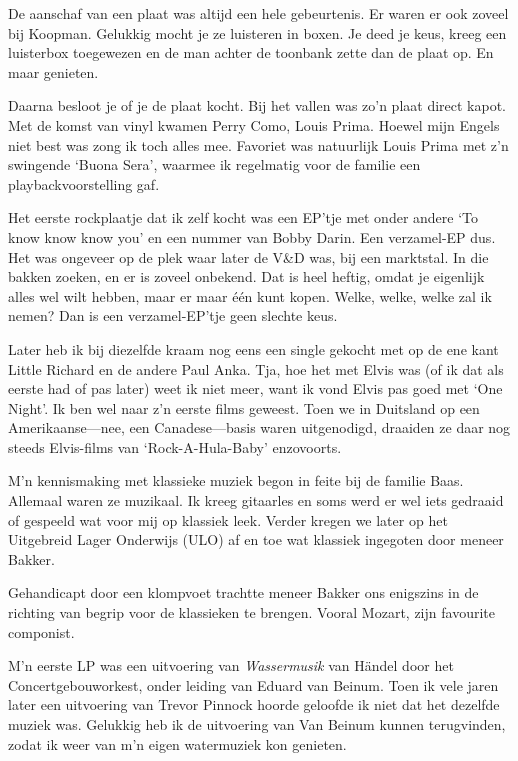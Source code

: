 \documentclass[12pt,twoside, openright]{memoir}
\begin{document}
De aanschaf van een plaat was altijd een hele gebeurtenis. Er waren er ook zoveel bij Koopman. Gelukkig mocht je ze luisteren in boxen. Je deed je keus, kreeg een luisterbox toegewezen en de man achter de toonbank zette dan de plaat op. En maar genieten. 

Daarna besloot je of je de plaat kocht. Bij het vallen was zo’n plaat direct kapot. Met de komst van vinyl kwamen Perry Como, Louis Prima. Hoewel mijn Engels niet best was zong ik toch alles mee. Favoriet was natuurlijk Louis Prima met z’n swingende `Buona Sera', waarmee ik regelmatig voor de familie een playbackvoorstelling gaf.


Het eerste rockplaatje dat ik zelf kocht was een EP'tje met onder andere `To know know know you' en een nummer van Bobby Darin. Een verzamel-EP dus. Het was ongeveer op de plek waar later de V\&D was, bij een marktstal. In die bakken zoeken, en er is zoveel onbekend. Dat is heel heftig, omdat je eigenlijk alles wel wilt hebben, maar er maar één kunt kopen. Welke, welke, welke zal ik nemen? Dan is een verzamel-EP'tje geen slechte keus.

Later heb ik bij diezelfde kraam nog eens een single gekocht met op de ene kant Little Richard en de andere Paul Anka. Tja, hoe het met Elvis was (of ik dat als eerste had of pas later) weet ik niet meer, want ik vond Elvis pas goed met `One Night'. Ik ben wel naar z'n eerste films geweest. Toen we in Duitsland op een Amerikaanse---nee, een Canadese---basis waren uitgenodigd, draaiden ze daar nog steeds Elvis-films van `Rock-A-Hula-Baby' enzovoorts.

M’n kennismaking met klassieke muziek begon in feite bij de familie Baas. Allemaal waren ze muzikaal. Ik kreeg gitaarles en soms werd er wel iets gedraaid of gespeeld wat voor mij op klassiek leek. Verder kregen we later op het Uitgebreid Lager Onderwijs (ULO) af en toe wat klassiek ingegoten door meneer Bakker. 

Gehandicapt door een klompvoet trachtte meneer Bakker ons enigszins in de richting van begrip voor de klassieken te brengen. Vooral Mozart, zijn favourite componist.

M’n eerste LP was een uitvoering van \emph{Wassermusik} van Händel door het Concertgebouworkest, onder leiding van Eduard van Beinum. Toen ik vele jaren later een uitvoering van Trevor Pinnock hoorde geloofde ik niet dat het dezelfde muziek was. Gelukkig heb ik de uitvoering van Van Beinum kunnen terugvinden, zodat ik weer van m’n eigen watermuziek kon genieten. 
\end{document}
